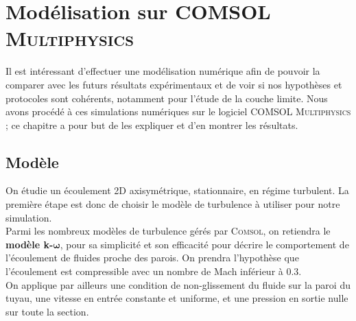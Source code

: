 \documentclass[12pt, a4paper]{report}
\begin{document}
%	
%	
	
	\chapter{Modélisation sur \textsc{COMSOL Multiphysics}}
	Il est intéressant d'effectuer une modélisation numérique afin de pouvoir la comparer avec les futurs résultats expérimentaux et de voir si nos hypothèses et protocoles sont cohérents, notamment pour l'étude de la couche limite. Nous avons procédé à ces simulations numériques sur le logiciel \textsc{COMSOL Multiphysics} ; ce chapitre a pour but de les expliquer et d'en montrer les résultats.
	
	\section{Modèle}
	On étudie un écoulement 2D axisymétrique, stationnaire, en régime turbulent. La première étape est donc de choisir le modèle de turbulence à utiliser pour notre simulation.\\
	
	\noindent Parmi les nombreux modèles de turbulence gérés par \textsc{Comsol}, on retiendra le \textbf{modèle k-}$\boldsymbol{\omega}$, pour sa simplicité et son efficacité pour décrire le comportement de l'écoulement de fluides proche des parois. On prendra l'hypothèse que l'écoulement est compressible avec un nombre de Mach inférieur à $0.3$.\\
	
	\noindent On applique par ailleurs une condition de non-glissement du fluide sur la paroi du tuyau, une vitesse en entrée constante et uniforme, et une pression en sortie nulle sur toute la section.\\
	
\end{document}
